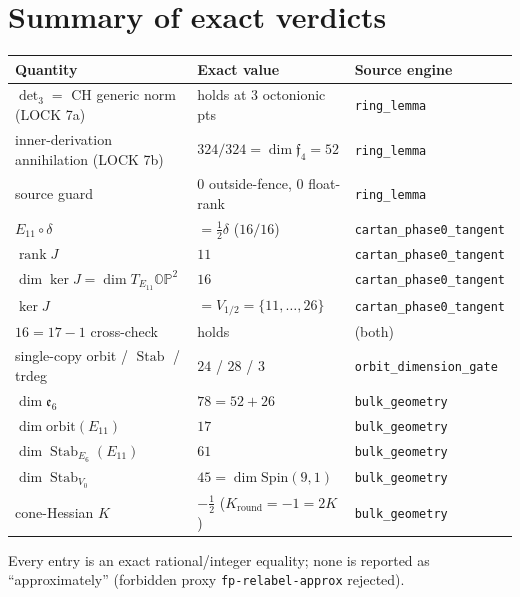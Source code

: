 \documentclass[11pt]{article}
\newcommand{\OP}{\mathbb{OP}^2}
\newcommand{\Eoneone}{E_{11}}
\newcommand{\Vhalf}{V_{1/2}}
\newcommand{\Stab}{\operatorname{Stab}}
\newcommand{\jord}{\circ}
\newcommand{\fr}{\mathfrak{f}_4}
\newcommand{\er}{\mathfrak{e}_6}
\begin{document}
\section{Summary of exact verdicts}
\label{sec:summary}
\begin{center}
\begin{tabular}{lll}
\hline
Quantity & Exact value & Source engine \\
\hline
$\det_3=$ CH generic norm (LOCK 7a) & holds at $3$ octonionic pts & \texttt{ring\_lemma} \\
inner-derivation annihilation (LOCK 7b) & $324/324=\dim\fr=52$ & \texttt{ring\_lemma} \\
source guard & $0$ outside-fence, $0$ float-rank & \texttt{ring\_lemma} \\
$\Eoneone\jord\delta$ & $=\tfrac12\delta$ ($16/16$) & \texttt{cartan\_phase0\_tangent} \\
$\operatorname{rank}J$ & $11$ & \texttt{cartan\_phase0\_tangent} \\
$\dim\ker J=\dim T_{\Eoneone}\OP$ & $16$ & \texttt{cartan\_phase0\_tangent} \\
$\ker J$ & $=\Vhalf=\{11,\dots,26\}$ & \texttt{cartan\_phase0\_tangent} \\
$16=17-1$ cross-check & holds & (both) \\
single-copy orbit / $\Stab$ / trdeg & $24$ / $28$ / $3$ & \texttt{orbit\_dimension\_gate} \\
$\dim\er$ & $78=52+26$ & \texttt{bulk\_geometry} \\
$\dim\mathrm{orbit}(\Eoneone)$ & $17$ & \texttt{bulk\_geometry} \\
$\dim\Stab_{E_6}(\Eoneone)$ & $61$ & \texttt{bulk\_geometry} \\
$\dim\Stab_{V_0}$ & $45=\dim\mathrm{Spin}(9,1)$ & \texttt{bulk\_geometry} \\
cone-Hessian $K$ & $-\tfrac12$ ($K_{\text{round}}=-1=2K$) & \texttt{bulk\_geometry} \\
\hline
\end{tabular}
\end{center}
Every entry is an exact rational/integer equality; none is reported as
``approximately'' (forbidden proxy \texttt{fp-relabel-approx} rejected).
\end{document}
